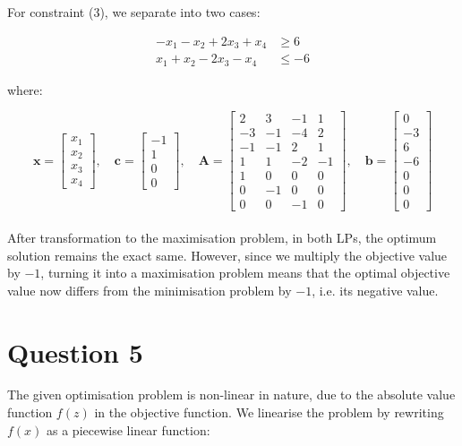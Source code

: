 \documentclass[12pt]{article}
\begin{document}
\noindent For constraint (3), we separate into two cases: 

\begin{align*}
    - x_{1} - x_{2} + 2 x_{3} + x_{4} & \geq 6 \\
    x_{1} + x_{2} -2 x_{3} -x_{4} & \leq -6
\end{align*}

\noindent where:

\begin{equation*}
    \mathbf{x} = \begin{bmatrix}
        x_{1} \\ x_{2} \\ x_{3} \\ x_{4} 
    \end{bmatrix},
    \quad 
    \mathbf{c} = \begin{bmatrix}
        -1 \\ 1 \\ 0 \\ 0
    \end{bmatrix},
    \quad 
    \mathbf{A} = \begin{bmatrix}
        2 & 3 & -1 & 1 \\ 
        -3 & -1 & -4 & 2 \\ 
        -1 & -1 & 2 & 1 \\ 
        1 & 1 & -2 & -1 \\ 
        1 & 0 & 0 & 0 \\ 
        0 & -1 & 0 & 0 \\ 
        0 & 0 & -1 & 0 
    \end{bmatrix},
    \quad 
    \mathbf{b} = \begin{bmatrix}
        0 \\ -3 \\ 6 \\ -6 \\ 0 \\ 0 \\ 0
    \end{bmatrix}
\end{equation*} \\

\noindent After transformation to the maximisation problem, in both LPs, the optimum solution remains the exact same. However, since we multiply the objective value by $-1$, turning it into a maximisation problem means that the optimal objective value now differs from the minimisation problem by $-1$, i.e. its negative value. 

\newpage 
\section*{Question 5}
The given optimisation problem is non-linear in nature, due to the absolute value function $f(z)$ in the objective function. We linearise the problem by rewriting $f(x)$ as a piecewise linear function:
\end{document}
